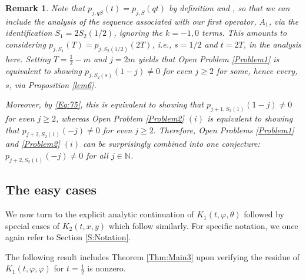 \documentclass[letterpaper,10pt]{amsart}
\newtheorem{remark}[thm]{Remark}
\numberwithin{equation}{section}
\begin{document}
\begin{remark}\label{Remark2}
Note that $p_{j,q S}(t)=p_{j,S}(q t)$ by definition and \cite[Eq. (2.18)]{OS22}, so that we can include the analysis of the sequence associated with our first operator, $A_1$, via the identification $S_1=2 S_2(1/2)$, ignoring the $k=-1,0$ terms. This amounts to considering $p_{j,S_1}(T)=p_{j,S_2(1/2)}(2T)$, i.e., $s=1/2$ and $t=2T$, in the analysis here. Setting $T=\frac{1}{2}-m$ and $j=2m$ yields that Open Problem \ref{Problem1} is equivalent to showing $p_{j,S_2(s)}(1-j)\neq 0$ for even $j\geq 2$ for some, hence every, $s$, via Proposition \ref{lem6}.

Moreover, by \eqref{Eq:75}, this is equivalent to showing that $p_{j+1,S_2(1)}(1-j)\neq0$ for even $j\geq 2$, whereas Open Problem \ref{Problem2} $(i)$ is equivalent to showing that $p_{j+2,S_2(1)}(-j)\neq0$ for  even $j\geq 2.$ Therefore, Open Problems \ref{Problem1} and \ref{Problem2} $(i)$ can be surprisingly combined into one conjecture: $p_{j+2,S_2(1)}(-j)\neq0$ for all $j\in\mathbb{N}$.
\end{remark}

\subsection{The easy cases}

We now turn to the explicit analytic continuation of $K_1(t,\varphi,\theta)$ followed by special cases of $K_2(t,x,y)$ which follow similarly. For specific notation, we once again refer to Section \ref{S:Notation}.

The following result includes Theorem \ref{Thm:Main3} upon verifying the residue of $K_1(t,\varphi,\varphi)$ for $t=\tfrac{1}{2}$ is nonzero.
\end{document}
